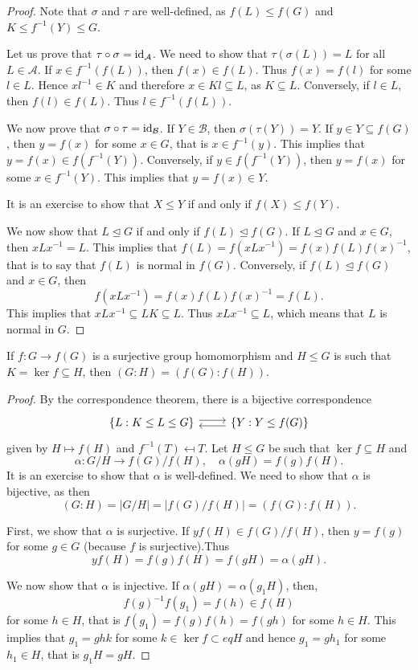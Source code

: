 \begin{proof}
    Note that $\sigma$ and $\tau$ are well-defined, as 
    $f(L)\leq f(G)$ and $K\leq f^{-1}(Y)\leq G$.

    Let us prove that $\tau\circ\sigma=\operatorname{id}_\mathcal{A}$. We need to show that $\tau(\sigma(L))=L$ for all $L\in\mathcal{A}$. If $x\in f^{-1}(f(L))$, then $f(x)\in f(L)$. Thus $f(x)=f(l)$ for some
    $l\in L$. Hence $xl^{-1}\in K$ and therefore 
    $x\in Kl\subseteq L$, as $K\subseteq L$.
    Conversely, if $l\in L$, then $f(l)\in f(L)$. Thus $l\in f^{-1}(f(L))$.

    We now prove that $\sigma\circ\tau=\operatorname{id}_\mathcal{B}$. If  $Y\in\mathcal{B}$, then $\sigma(\tau(Y))=Y$. If $y\in Y\subseteq f(G)$, then $y=f(x)$ for some $x\in G$, that is $x\in f^{-1}(y)$. This implies that $y=f(x)\in f(f^{-1}(Y))$. Conversely, if $y\in f(f^{-1}(Y))$, then $y=f(x)$ for some $x\in f^{-1}(Y)$. This implies that $y=f(x)\in Y$.

    It is an exercise to show that 
    $X\leq Y$ if and only if $f(X)\leq f(Y)$.

    We now show that $L\unlhd G$ if and only if 
    $f(L)\unlhd f(G)$. If $L\unlhd G$ and $x\in G$,
    then $xLx^{-1}=L$. This implies that $f(L)=f(xLx^{-1})=f(x)f(L)f(x)^{-1}$, that is
    to say that $f(L)$ is normal in $f(G)$. Conversely, if
    $f(L)\unlhd f(G)$ and $x\in G$, then 
        \[
        f(xLx^{-1})=f(x)f(L)f(x)^{-1}=f(L).
        \]
    This implies that $xLx^{-1}\subseteq LK\subseteq L$. Thus 
    $xLx^{-1}\subseteq L$, which means that $L$ is normal in $G$. 
\end{proof}

\begin{proposition}
    If $f\colon G\to f(G)$ is a surjective group homomorphism 
    and $H\leq G$ is such that $K=\ker f
\subseteq H$, then
        $(G:H)=(f(G):f(H))$.
\end{proposition}

\begin{proof}
By the correspondence theorem, 
there is a bijective correspondence 
\[
\begin{tikzcd}
        {\{L:K\leq L\leq G\}} & {\{Y:Y\leq f(G)\}}
        \arrow[shift left=1, from=1-1, to=1-2]
        \arrow[shift left=1, from=1-2, to=1-1]
\end{tikzcd}
\]
given by $H\mapsto f(H)$ and 
$f^{-1}(T)\mapsfrom T$. Let $H\leq G$ be such that
$\ker f\subseteq H$ and 
\[
\alpha\colon G/H\to f(G)/f(H),\quad \alpha(gH)=f(g)f(H).
\]
It is an exercise to show that $\alpha$ is well-defined. 
We need to show that $\alpha$ is bijective, as then 
\[
(G:H)=|G/H|=|f(G)/f(H)|=(f(G):f(H)).
\]

First, we show that $\alpha$ is surjective. If $yf(H)\in f(G)/f(H)$, 
then
$y=f(g)$ for some $g\in G$ (because $f$ is surjective).Thus
\[
yf(H)=f(g)f(H)=f(gH)=\alpha(gH).
\]

We now show that $\alpha$ is injective. If $\alpha(gH)=\alpha(g_1H)$, then, 
\[
f(g)^{-1}f(g_1)=f(h)\in f(H)
\]
for some $h\in H$, that is 
$f(g_1)=f(g)f(h)=f(gh)$ for some $h\in H$. 
This implies that $g_1=ghk$ for some $k\in\ker f\subset
eq H$ and hence 
$g_1=gh_1$ for some $h_1\in H$, that is $g_1H=gH$.
\end{proof}

